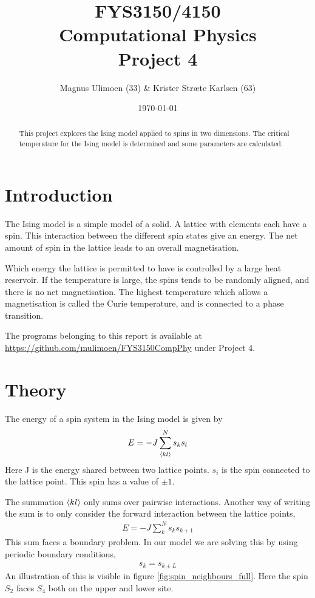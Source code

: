 \documentclass[11pt,a4paper,english]{article}
\title{FYS3150/4150\\Computational Physics\\Project 4}
\author{Magnus Ulimoen (33) \& Krister Stræte Karlsen (63)}
\date{\today}
\numberwithin{equation}{section}
\begin{document}
\maketitle

\begin{abstract}
This project explores the Ising model applied to spins in two dimensions.
The critical temperature for the Ising model is determined and some
parameters are calculated.
\end{abstract}



\section{Introduction}

The Ising model is a simple model of a solid. A lattice with elements 
each have a spin. This interaction between the different spin states
give an energy. The net amount of spin in the 
lattice leads to an overall magnetisation. 

Which energy the lattice 
is permitted to have is controlled by a large heat reservoir. If 
the temperature is large, the spins tends to be randomly aligned, 
and there is no net magnetisation. The highest temperature which 
allows a magnetisation is called the Curie temperature, and is 
connected to a phase transition.

The programs belonging to this report is available at 
\url{https://github.com/mulimoen/FYS3150CompPhy} under Project 4.

\section{Theory}

The energy of a spin system in the Ising model is given by
\begin{gather}
E = -J\sum_{\expval{kl}}^N s_k s_l
\end{gather}
Here J is the energy shared between two lattice points. $s_i$ is the spin
connected to the lattice point. This spin has a value of $\pm 1$.

The summation $\expval{kl}$ only sums over pairwise interactions.
Another way of writing the sum is to only consider the forward 
interaction between the lattice points,
\begin{gather}
E = -J \sum_{k}^N s_k s_{k+1}
\label{eq:Esum}
\end{gather}
This sum faces a boundary problem. In our model we are solving this 
by using periodic boundary conditions,
\begin{gather}
s_k = s_{k \pm L}
\label{eq:boundary}
\end{gather}
An illustration of this is visible in figure \ref{fig:spin_neighbours_full}.
Here the spin $S_2$ faces $S_4$ both on the upper and lower site.
\end{document}
